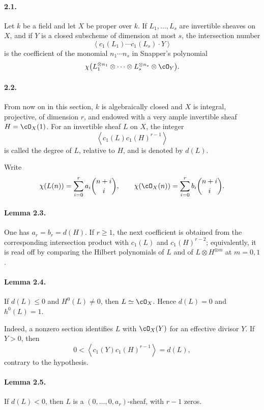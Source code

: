 \documentclass[11pt]{article}
\theoremstyle{plain}
\theoremstyle{definition}
\theoremstyle{remark}
\begin{document}
\paragraph{2.1.}
Let $k$ be a field and let $X$ be proper over $k$. If $L_1,\ldots,L_s$ are invertible sheaves on $X$, and if $Y$ is a closed subscheme of dimension at most $s$, the intersection number
\[
\left\langle c_1(L_1)\cdots c_1(L_s)\cdot Y\right\rangle
\]
is the coefficient of the monomial $n_1\cdots n_s$ in Snapper's polynomial
\[
\chi\bigl(L_1^{\otimes n_1}\otimes\cdots\otimes L_s^{\otimes n_s}\otimes\cO_Y\bigr).
\]

\paragraph{2.2.}
From now on in this section, $k$ is algebraically closed and $X$ is integral, projective, of dimension $r$, and endowed with a very ample invertible sheaf $H=\cO_X(1)$. For an invertible sheaf $L$ on $X$, the integer
\[
\left\langle c_1(L)c_1(H)^{r-1}\right\rangle
\]
is called the degree of $L$, relative to $H$, and is denoted by $d(L)$.

Write
\[
\chi(L(n))=\sum_{i=0}^r a_i\binom{n+i}{i},\qquad
\chi(\cO_X(n))=\sum_{i=0}^r b_i\binom{n+i}{i}.
\]

\paragraph{Lemma 2.3.}
One has $a_r=b_r=d(H)$. If $r\geq1$, the next coefficient is obtained from the corresponding intersection product with $c_1(L)$ and $c_1(H)^{r-2}$; equivalently, it is read off by comparing the Hilbert polynomials of $L$ and of $L\otimes H^{\otimes m}$ at $m=0,1$.

\paragraph{Lemma 2.4.}
If $d(L)\leq0$ and $H^0(L)\neq0$, then $L\simeq\cO_X$. Hence $d(L)=0$ and $h^0(L)=1$.

Indeed, a nonzero section identifies $L$ with $\cO_X(Y)$ for an effective divisor $Y$. If $Y>0$, then
\[
0<\left\langle c_1(Y)c_1(H)^{r-1}\right\rangle=d(L),
\]
contrary to the hypothesis.

\paragraph{Lemma 2.5.}
If $d(L)<0$, then $L$ is a $(0,\ldots,0,a_r)$-sheaf, with $r-1$ zeros.
\end{document}

